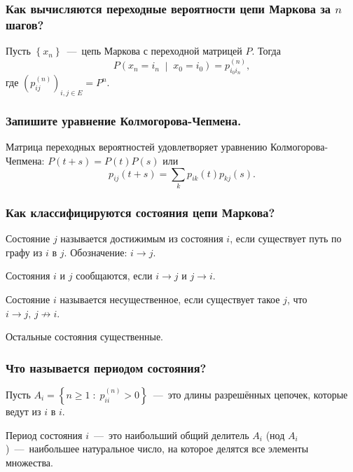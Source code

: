 \subsubsection*{Как вычисляются переходные вероятности цепи Маркова за $n$
                шагов?}

Пусть $ \left\{ x_n \right\} $~---~цепь Маркова с переходной матрицей $P$.
Тогда
\begin{equation*}
  P \left( x_n = i_n \; \middle| \; x_0 = i_0 \right) =
  p_{i_0 i_n}^{ \left( n \right) },
\end{equation*}
где $ \left( p_{ij}^{ \left( n \right) } \right)_{i, j \in E} = P^n$.

\subsubsection*{Запишите уравнение Колмогорова-Чепмена.}

Матрица переходных вероятностей удовлетворяет уравнению Колмогорова-Чепмена:
$P \left( t + s \right) = P \left( t \right) P \left( s \right) $ или
\begin{equation*}
  p_{ij} \left( t + s \right) =
  \sum \limits_{k} p_{ik} \left( t \right) p_{kj} \left( s \right).
\end{equation*}

\subsubsection*{Как классифицируются состояния цепи Маркова?}

Состояние $j$ называется достижимым из состояния $i$,
если существует путь по графу из $i$ в $j$.
Обозначение: $i \to j$.

Состояния $i$ и $j$ сообщаются, если $i \to j$ и $j \to i$.

Состояние $i$ называется несущественное, если существует такое $j$,
что $i \to j, \, j \not \to i$.

Остальные состояния существенные.

\subsubsection*{Что называется периодом состояния?}

Пусть
$A_i = \left\{ n \geq 1 \; : \; p_{ii}^{ \left( n \right) } > 0 \right\} $~---~это
длины разрешённых цепочек, которые ведут из $i$ в $i$.

Период состояния $i$~---~это наибольший общий делитель $A_i$
(нод $A_i$)~---~наибольшее натуральное число,
на которое делятся все элементы множества.


